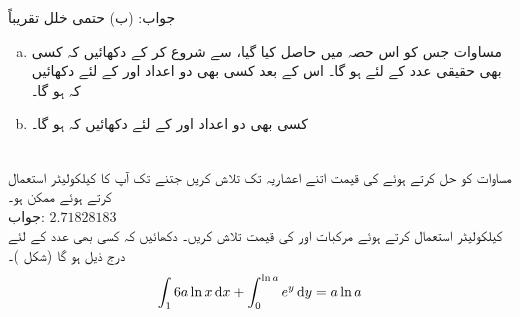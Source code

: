 جواب:\quad
(ب) حتمی خلل تقریباً 
\\
\begin{enumerate}[a.]
\item
مساوات  جس کو اس حصہ میں حاصل کیا گیا، سے شروع کر کے دکھائیں کہ کسی بھی حقیقی عدد  کے لئے  ہو گا۔ اس کے بعد کسی بھی دو اعداد  اور  کے لئے دکھائیں کہ  ہو گا۔
\item
کسی بھی دو اعداد  اور  کے لئے دکھائیں کہ  ہو گا۔
\end{enumerate}
\\
مساوات کو حل کرتے ہوئے  کی قیمت اتنے اعشاریہ تک تلاش کریں جتنے تک آپ کا کیلکولیٹر استعمال کرتے ہوئے ممکن ہو۔\\
جواب:\quad
$\num{2.71828183}$  
\\
کیلکولیٹر استعمال کرتے ہوئے مرکبات  اور  کی قیمت تلاش کریں۔
دکھائیں کہ کسی بھی عدد  کے لئے درج ذیل ہو گا (شکل )۔
\begin{align*}
\int_16a\ln x\dif x+\int_0^{\ln a}e^y\dif y=a\ln a
\end{align*}

